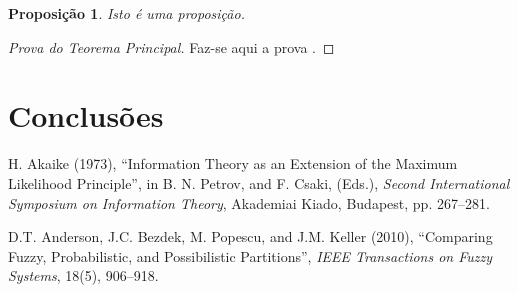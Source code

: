 \documentclass[12pt,reqno, twoside]{amsbook}
\theoremstyle{plain}
\newtheorem{proposition}{Proposi\c{c}\~{a}o}[chapter]
\numberwithin{equation}{chapter}
\numberwithin{section}{chapter}
\begin{document}
\begin{proposition}
Isto \'{e} uma proposi\c{c}\~{a}o.
\end{proposition}


\begin{proof}
[Prova do Teorema Principal] Faz-se aqui a prova .
\end{proof}
\chapter{Conclus\~{o}es}

\renewcommand{\bibname}{Refer\^{e}ncias Bibliogr\'{a}ficas}


\def\bibindent{0.7cm}
\begin{thebibliography}{99\kern\bibindent}
\makeatletter
\let\old@biblabel\@biblabel
\def\@biblabel#1{\old@biblabel{#1}\kern\bibindent}
\let\old@bibitem\bibitem
\def\bibitem#1{\old@bibitem{#1}\leavevmode\kern-\bibindent}
\makeatother
\makeatletter
\renewcommand\@biblabel[1]{}
\makeatother

 H. Akaike (1973), \textquotedblleft Information Theory as an
Extension of the Maximum Likelihood Principle\textquotedblright, in B. N.
Petrov, and F. Csaki, (Eds.), \textit{Second International Symposium on
Information Theory}, Akademiai Kiado, Budapest, pp. 267--281.

 D.T. Anderson, J.C. Bezdek, M. Popescu, and J.M. Keller
(2010), \textquotedblleft Comparing Fuzzy, Probabilistic, and Possibilistic
Partitions\textquotedblright, \textit{IEEE Transactions on Fuzzy Systems},
18(5), 906--918.
\end{thebibliography}
\end{document}

